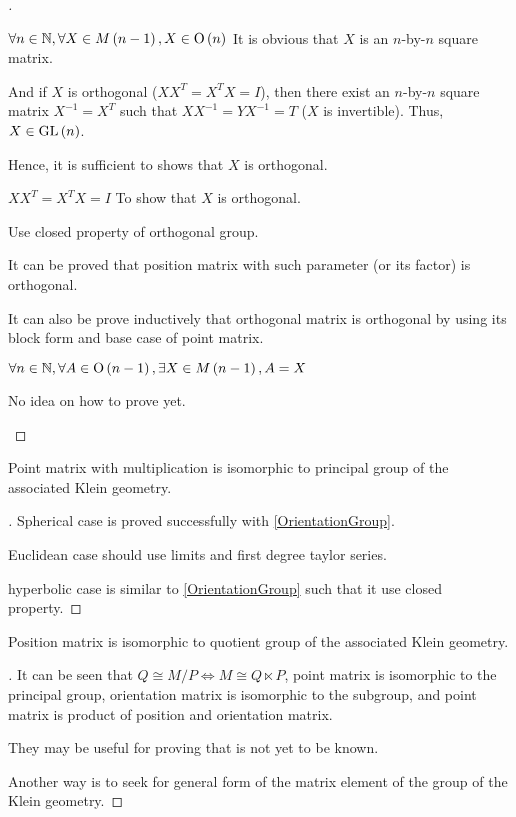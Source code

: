 \documentclass[stu, babel, american, biblatex, a4paper, draftall]{apa7}
\begin{document}
\begin{proof}[]
\begin{subproof}{$\forall n\in\mathbb{N}, \forall X\in M\left(n-1\right), X\in \operatorname{O}\left(n\right)$}
        It is obvious that $X$ is an $n$-by-$n$ square matrix.

        And if $X$ is orthogonal ($X X^T = X^T X = I$),
        then there exist an $n$-by-$n$ square matrix $X^{-1} = X^T$ such that $X X^{-1} = Y X^{-1} = T$ ($X$ is invertible).
        Thus, $X\in\operatorname{GL}\left(n\right)$.

        Hence, it is sufficient to shows that $X$ is orthogonal.

        \begin{subproof}{$X X^T = X^T X = I$}
            To show that $X$ is orthogonal.

            \skipped

            Use closed property of orthogonal group.

            It can be proved that position matrix with such parameter (or its factor) is orthogonal.

            It can also be prove inductively that orthogonal matrix is orthogonal by using its block form and base case of point matrix.
        \end{subproof}
    \end{subproof}
    \begin{subproof}{$\forall n\in\mathbb{N}, \forall A\in \operatorname{O}\left(n-1\right), \exists X\in M\left(n-1\right), A=X$}
        \skipped

        No idea on how to prove yet.
    \end{subproof}
\end{proof}
\begin{lemma}\label{PointGroup}
    Point matrix with multiplication
    is isomorphic to principal group of the associated Klein geometry.
\end{lemma}
\begin{proof}[]
    \skipped

    Spherical case is proved successfully with \cref{OrientationGroup}.

    Euclidean case should use limits and first degree taylor series.

    hyperbolic case is similar to \cref{OrientationGroup} such that it use closed property.
\end{proof}
\begin{lemma}\label{PositionGroup}
    Position matrix is isomorphic to quotient group of the associated Klein geometry.
\end{lemma}
\begin{proof}[]
    \skipped

    It can be seen that $Q\cong M/P \iff M \cong Q \ltimes P$,
    point matrix is isomorphic to the principal group,
    orientation matrix is isomorphic to the subgroup,
    and point matrix is product of position and orientation matrix.

    They may be useful for proving that is not yet to be known.

    Another way is to seek for general form of the matrix element of the group of the Klein geometry.
\end{proof}
\end{document}
